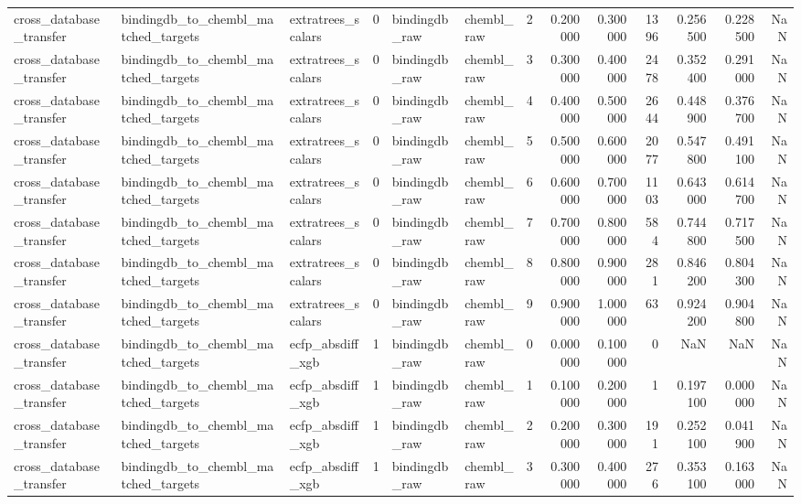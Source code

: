 \begin{longtable}{lllrllrrrrrrr}
cross\_database\_transfer & bindingdb\_to\_chembl\_matched\_targets & extratrees\_scalars & 0 & bindingdb\_raw & chembl\_raw & 2 & 0.200000 & 0.300000 & 1396 & 0.256500 & 0.228500 & NaN \\
cross\_database\_transfer & bindingdb\_to\_chembl\_matched\_targets & extratrees\_scalars & 0 & bindingdb\_raw & chembl\_raw & 3 & 0.300000 & 0.400000 & 2478 & 0.352400 & 0.291000 & NaN \\
cross\_database\_transfer & bindingdb\_to\_chembl\_matched\_targets & extratrees\_scalars & 0 & bindingdb\_raw & chembl\_raw & 4 & 0.400000 & 0.500000 & 2644 & 0.448900 & 0.376700 & NaN \\
cross\_database\_transfer & bindingdb\_to\_chembl\_matched\_targets & extratrees\_scalars & 0 & bindingdb\_raw & chembl\_raw & 5 & 0.500000 & 0.600000 & 2077 & 0.547800 & 0.491100 & NaN \\
cross\_database\_transfer & bindingdb\_to\_chembl\_matched\_targets & extratrees\_scalars & 0 & bindingdb\_raw & chembl\_raw & 6 & 0.600000 & 0.700000 & 1103 & 0.643000 & 0.614700 & NaN \\
cross\_database\_transfer & bindingdb\_to\_chembl\_matched\_targets & extratrees\_scalars & 0 & bindingdb\_raw & chembl\_raw & 7 & 0.700000 & 0.800000 & 584 & 0.744800 & 0.717500 & NaN \\
cross\_database\_transfer & bindingdb\_to\_chembl\_matched\_targets & extratrees\_scalars & 0 & bindingdb\_raw & chembl\_raw & 8 & 0.800000 & 0.900000 & 281 & 0.846200 & 0.804300 & NaN \\
cross\_database\_transfer & bindingdb\_to\_chembl\_matched\_targets & extratrees\_scalars & 0 & bindingdb\_raw & chembl\_raw & 9 & 0.900000 & 1.000000 & 63 & 0.924200 & 0.904800 & NaN \\
cross\_database\_transfer & bindingdb\_to\_chembl\_matched\_targets & ecfp\_absdiff\_xgb & 1 & bindingdb\_raw & chembl\_raw & 0 & 0.000000 & 0.100000 & 0 & NaN & NaN & NaN \\
cross\_database\_transfer & bindingdb\_to\_chembl\_matched\_targets & ecfp\_absdiff\_xgb & 1 & bindingdb\_raw & chembl\_raw & 1 & 0.100000 & 0.200000 & 1 & 0.197100 & 0.000000 & NaN \\
cross\_database\_transfer & bindingdb\_to\_chembl\_matched\_targets & ecfp\_absdiff\_xgb & 1 & bindingdb\_raw & chembl\_raw & 2 & 0.200000 & 0.300000 & 191 & 0.252100 & 0.041900 & NaN \\
cross\_database\_transfer & bindingdb\_to\_chembl\_matched\_targets & ecfp\_absdiff\_xgb & 1 & bindingdb\_raw & chembl\_raw & 3 & 0.300000 & 0.400000 & 276 & 0.353100 & 0.163000 & NaN \\

\end{longtable}

